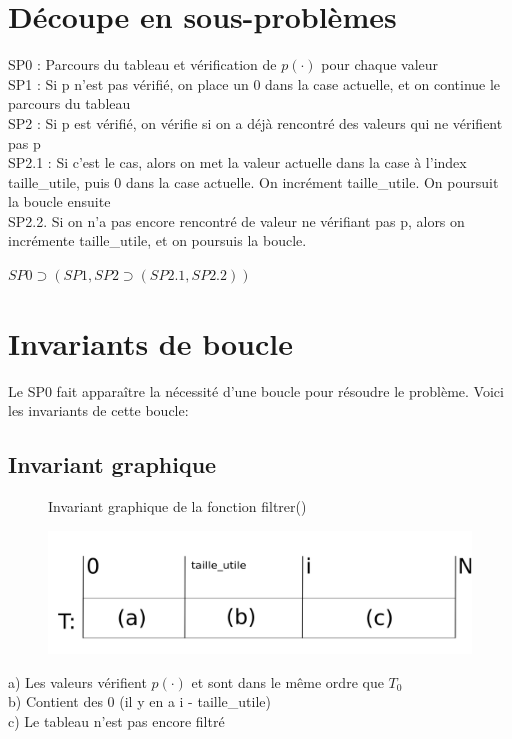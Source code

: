 \documentclass[a4paper, 11pt, oneside]{article}
\begin{document}
\section{Découpe en sous-problèmes}
SP0 : Parcours du tableau et vérification de  $p(\cdot)$ pour chaque valeur
\\SP1 : Si p n'est pas vérifié, on place un 0 dans la case actuelle, et on continue le parcours du tableau
\\SP2 : Si p est vérifié, on vérifie si on a déjà rencontré des valeurs qui ne vérifient pas p
\\SP2.1 : Si c'est le cas, alors on met la valeur actuelle dans la case à l'index taille\_utile, puis 0 dans la case actuelle. On incrément taille\_utile. On poursuit la boucle ensuite
\\SP2.2. Si on n'a pas encore rencontré de valeur ne vérifiant pas p, alors on incrémente taille\_utile, et on poursuis la boucle. 

$SP0 \supset (SP1, SP2 \supset (SP2.1, SP2.2))$



\section{Invariants de boucle}
Le SP0 fait apparaître la nécessité d'une boucle pour résoudre le problème. 
Voici les invariants de cette boucle:

\subsection{Invariant graphique}
\begin{figure}{Invariant graphique de la fonction filtrer()}

\includegraphics[scale = 0.5]{Capture d’écran 2022-03-23 165331.png}
\end{figure}

a) Les valeurs vérifient $p(\cdot)$ et sont dans le même ordre que $T_{0}$\\
b) Contient des 0 (il y en a i - taille\_utile)\\
c) Le tableau n'est pas encore filtré\\
\end{document}

